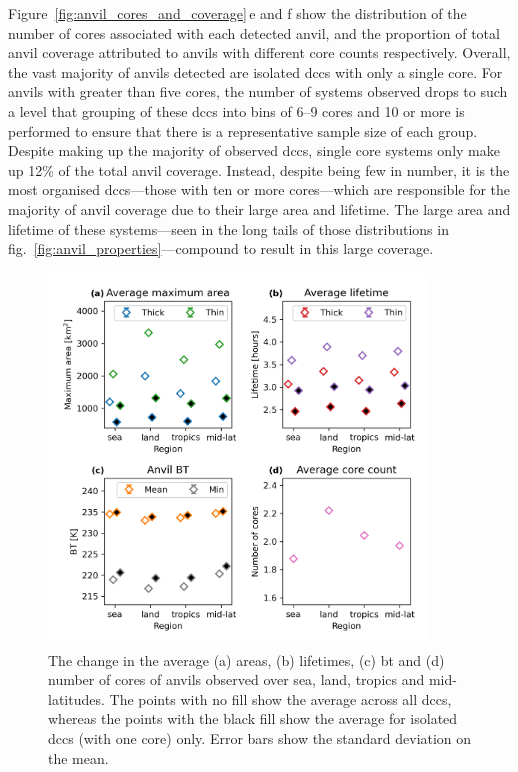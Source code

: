 Figure~\ref{fig:anvil_cores_and_coverage}\,e and f show the distribution of the number of cores associated with each detected anvil, and the proportion of total anvil coverage attributed to anvils with different core counts respectively.
Overall, the vast majority of anvils detected are isolated \acrshort{dcc}s with only a single core.
For anvils with greater than five cores, the number of systems observed drops to such a level that grouping of these \acrshort{dcc}s into bins of 6--9 cores and 10 or more is performed to ensure that there is a representative sample size of each group.
Despite making up the majority of observed \acrshort{dcc}s, single core systems only make up 12\% of the total anvil coverage.
Instead, despite being few in number, it is the most organised \acrshort{dcc}s---those with ten or more cores---which are responsible for the majority of anvil coverage due to their large area and lifetime.
The large area and lifetime of these systems---seen in the long tails of those distributions in fig.~\ref{fig:anvil_properties}---compound to result in this large coverage.

\begin{figure}[tp]
    \centering
    \includegraphics[width=0.9\textwidth]{figures/chapter2_22.png}
    \caption[
    The change in the average areas, lifetimes, \acrshort{bt} and number of cores of anvils observed over sea, land, tropics and mid-latitudes.
    ]{
    The change in the average (a) areas, (b) lifetimes, (c) \acrshort{bt} and (d) number of cores of anvils observed over sea, land, tropics and mid-latitudes. The points with no fill show the average across all \acrshort{dcc}s, whereas the points with the black fill show the average for isolated \acrshort{dcc}s (with one core) only. Error bars show the standard deviation on the mean.
    }
    \label{fig:anvil_properties_regions}
\end{figure}


